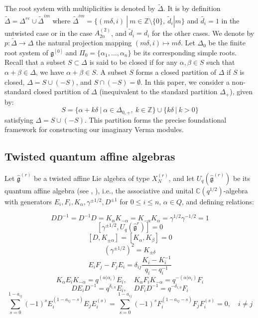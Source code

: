 \documentclass[12pt]{amsart}
\numberwithin{equation}{section}
\newcommand{\Z}{\ensuremath{\mathbb{Z}}}
\newcommand{\C}{\ensuremath{\mathbb{C}}}
\newcommand{\g}{\ensuremath{\mathfrak{g}}}
\begin{document}
The root system with multiplicities is denoted by $\tilde{\Delta}$. It is by definition $\tilde{\Delta} = \Delta^{re} \cup \tilde{\Delta}^{im}$ where $\tilde{\Delta}^{im} = \{(m\delta, i) \ | \ m\in \Z\setminus\{0\},\  \tilde{d}_i|m \}$ and $\tilde{d_i} = 1$ in the untwisted case or in the case $A_{2n}^{(2)}$, and $\tilde{d}_i = d_i$ for the other cases. We denote by $p: \tilde{\Delta} \to \Delta$ the natural projection mapping $(m\delta, i) \mapsto m\delta$. Let $\Delta_0$ be the finite root system of $\g^{[0]}$ and $\Pi_0=\{\alpha_1, \dots, \alpha_n\}$ be its corresponding simple roots.\\

Recall that a subset $S \subset \Delta$ is said to be closed if for any $\alpha, \beta \in S$ such that $\alpha + \beta \in \Delta$, we have $\alpha + \beta \in S$. A subset $S$ forms a closed partition of $\Delta$ if $S$ is closed, $\Delta = S \cup (-S)$, and $S \cap (-S) = \emptyset$. In this paper, we consider a non-standard closed partition of $\Delta$ (inequivalent to the standard partition $\Delta_+$), given by:
$$ S = \{ \alpha + k\delta \ \vert \ \alpha\in \Delta_{0,+}, \ k\in \Z \} \cup \{ k\delta \ \vert \ k>0 \} $$
satisfying $\Delta = S \cup (-S)$. This partition forms the precise foundational framework for constructing our imaginary Verma modules.

\subsection{Twisted quantum affine algebras}


Let $\hat{\g}^{(r)}$ be a twisted affine Lie algebra of type $X_N^{(r)}$, and let $U_q(\hat{\g}^{(r)})$ be its quantum affine algebra (see \cite{CP}, \cite{L01}), i.e., the associative and unital $\C(q^{1/2})$-algebra with generators $E_i, F_i, K_{\alpha}, \gamma^{\pm1/2}, D^{\pm 1}$ for $0\leq i \leq n$, $\alpha\in Q$, and defining relations:

$$ DD^{-1} = D^{-1}D = K_\alpha K_{-\alpha} = K_{-\alpha} K_\alpha = \gamma^{1/2}\gamma^{-1/2}=1 $$
$$ [\gamma^{\pm1/2}, U_q(\hat{\g}^{r})]=0$$
$$[D,K_{\pm \alpha}]=[K_\alpha,K_\beta]=0$$
$$(\gamma^{\pm 1/2})^2 = K_{\pm \delta} $$
$$ E_iF_j-F_jE_i = \delta_{ij}\frac{K_i - K_i^{-1}}{q_i-q_i^{-1}} $$
$$ K_{\alpha}E_iK_{-\alpha}= q^{(\alpha|\alpha_i)}E_i, \quad K_{\alpha}F_iK_{-\alpha}= q^{-(\alpha|\alpha_i)}F_i$$
$$ DE_iD^{-1} = q^{\delta_{i,0}}E_i, \quad DF_iD^{-1} = q^{-\delta_{i,0}}F_i $$
$$ \sum_{s=0}^{1-a_{ij}} (-1)^s E_i^{(1-a_{ij}-s)}E_jE_i^{(s)} =  \sum_{s=0}^{1-a_{ij}} (-1)^s F_i^{(1-a_{ij}-s)}F_jF_i^{(s)} = 0, \quad i\neq j $$
\end{document}
